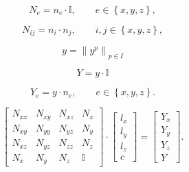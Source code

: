 \begin{equation*}
  N_e = n_e \cdot \mathbb{I},
  \qquad e \in \left\{ x, y, z \right\},
\end{equation*}

\begin{equation*}
  N_{ij} = n_i \cdot n_j,
  \qquad i, j \in \left\{ x, y, z \right\},
\end{equation*}

\begin{equation*}
  y = \left\| y^p \right\|_{p \in I}
\end{equation*}

\begin{equation*}
  Y = y \cdot \mathbb{I}
\end{equation*}

\begin{equation*}
  Y_e = y \cdot n_e,
  \qquad e \in \left\{ x, y, z \right\}.
\end{equation*}

\begin{equation*}
  \begin{bmatrix}
    N_{xx} & N_{xy} & N_{xz} & N_{x} \\
    N_{xy} & N_{yy} & N_{yz} & N_{y} \\
    N_{xz} & N_{yz} & N_{zz} & N_{z} \\
    N_{x} & N_{y} & N_{z} & \mathbb{I}
  \end{bmatrix}
  \cdot
  \begin{bmatrix}
    l_x \\
    l_y \\
    l_z \\
    c
  \end{bmatrix}
  =
  \begin{bmatrix}
    Y_x \\
    Y_y \\
    Y_z \\
    Y
  \end{bmatrix}.
\end{equation*}

